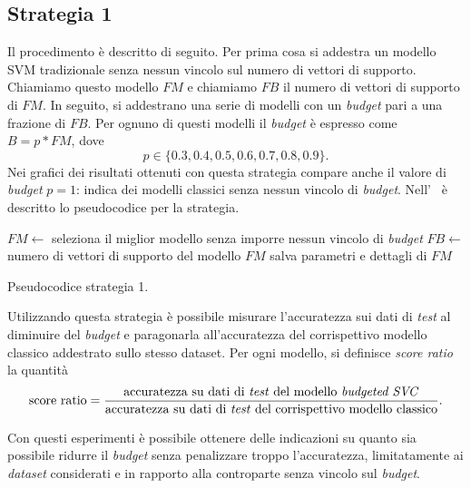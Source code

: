 \subsection{Strategia 1}
Il procedimento è descritto di seguito. Per prima cosa si addestra un modello SVM tradizionale senza nessun vincolo sul numero di vettori di supporto. Chiamiamo questo modello $FM$ e chiamiamo $FB$ il numero di vettori di supporto di $FM$.
In seguito, si addestrano una serie di modelli con un \emph{budget} pari a una frazione di $FB$.
Per ognuno di questi modelli il \emph{budget} è espresso come $B=p*FM$, dove
\begin{equation*}
    p\in\{0.3, 0.4, 0.5, 0.6, 0.7, 0.8, 0.9\}.
\end{equation*}
Nei grafici dei risultati ottenuti con questa strategia compare anche il valore di \emph{budget} $p=1$: indica dei modelli classici senza nessun vincolo di \emph{budget}.
Nell'~ è descritto lo pseudocodice per la strategia.
\begin{algorithm}
    \SetAlgoLined
    $FM \gets$ seleziona il miglior modello senza imporre nessun vincolo di \emph{budget}\;
    $FB \gets$ numero di vettori di supporto del modello $FM$\;
    salva parametri e dettagli di $FM$\;
\caption{Pseudocodice strategia 1.}
\label{alg:esperimenti_1}
\end{algorithm}

Utilizzando questa strategia è possibile misurare l'accuratezza sui dati di \emph{test} al diminuire del \emph{budget} e paragonarla all'accuratezza del corrispettivo modello classico addestrato sullo stesso dataset.
Per ogni modello, si definisce \emph{score ratio} la quantità
\begin{equation*}
    \text{score ratio} = \frac{\text{accuratezza su dati di \emph{test} del modello \emph{budgeted SVC}}}{\text{accuratezza su dati di \emph{test} del corrispettivo modello classico}}.
\end{equation*}

Con questi esperimenti è possibile ottenere delle indicazioni su quanto sia possibile ridurre il \emph{budget} senza penalizzare troppo l'accuratezza, limitatamente ai \emph{dataset} considerati e in rapporto alla controparte senza vincolo sul \emph{budget}.

